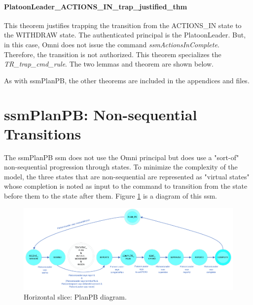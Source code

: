 \documentclass[../../main/main.tex]{subfiles}
\begin{document}
\HOLssmConductORPTheoremsPlatoonLeaderXXACTIONSXXINXXexecXXlemma
\HOLssmConductORPTheoremsPlatoonLeaderXXACTIONSXXINXXexecXXjustifiedXXlemma
\HOLssmConductORPTheoremsPlatoonLeaderXXACTIONSXXINXXexecXXjustifiedXXthm

\paragraph*{PlatoonLeader_ACTIONS_IN_trap_justified_thm}
This theorem justifies trapping the transition from the ACTIONS_IN state to the WITHDRAW state.  The authenticated principal is the PlatoonLeader.  But, in this case, Omni does not issue the command \textit{ssmActionsInComplete}.  Therefore, the transition is not authorized.  This theorem specializes the \textit{TR_trap_cmd_rule}.  The two lemmas and theorem are shown below.

\HOLssmConductORPTheoremsPlatoonLeaderXXACTIONSXXINXXtrapXXlemma
\HOLssmConductORPTheoremsPlatoonLeaderXXACTIONSXXINXXtrapXXjustifiedXXlemma
\HOLssmConductORPTheoremsPlatoonLeaderXXACTIONSXXINXXtrapXXjustifiedXXthm


As with ssmPlanPB, the other theorems are included in the appendices and files.
\section{ssmPlanPB: Non-sequential Transitions}
The ssmPlanPB \gls{ssm} does not use the Omni principal but does use a "sort-of" non-sequential progression through states.  To minimize the complexity of the model, the three states that are non-sequential are represented as "virtual states" whose completion is noted as input to the command to transition from the state before them to the state after them.  Figure \ref{ssmPlanPBDiagram2a} is a diagram of this \gls{ssm}.

\begin{figure}[h!]
\centering
\includegraphics[width=\textwidth]{../figures/ssmPlanPBDiagram}
\caption{\label{ssmPlanPBDiagram2a} Horizontal slice: PlanPB diagram.}
\end{figure}
\end{document}
